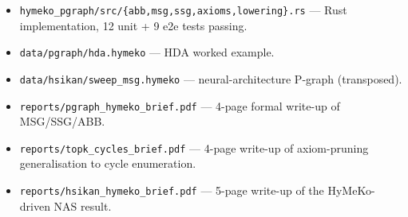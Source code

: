 \documentclass[11pt,a4paper]{article}
\newcommand{\code}[1]{\texttt{\small #1}}
\begin{document}
\begin{itemize}
\item \code{hymeko\_pgraph/src/\{abb,msg,ssg,axioms,lowering\}.rs}
      --- Rust implementation, 12 unit + 9 e2e tests passing.
\item \code{data/pgraph/hda.hymeko} --- HDA worked example.
\item \code{data/hsikan/sweep\_msg.hymeko} --- neural-architecture
      P-graph (transposed).
\item \code{reports/pgraph\_hymeko\_brief.pdf} --- 4-page formal
      write-up of MSG/SSG/ABB.
\item \code{reports/topk\_cycles\_brief.pdf} --- 4-page write-up of
      axiom-pruning generalisation to cycle enumeration.
\item \code{reports/hsikan\_hymeko\_brief.pdf} --- 5-page write-up
      of the HyMeKo-driven NAS result.
\end{itemize}
\end{document}
